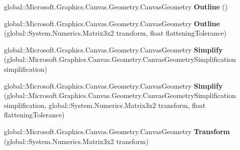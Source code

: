 \begin{DoxyCompactItemize}
\item 
\mbox{\label{interface_microsoft_1_1_graphics_1_1_canvas_1_1_geometry_1_1_i_canvas_geometry_a7b1a716eb0cbfbd552347d14e00268b7}} 
global\+::\+Microsoft.\+Graphics.\+Canvas.\+Geometry.\+Canvas\+Geometry {\bfseries Outline} ()
\item 
\mbox{\label{interface_microsoft_1_1_graphics_1_1_canvas_1_1_geometry_1_1_i_canvas_geometry_ab685f87179af5eed5881feb2e4aa5c22}} 
global\+::\+Microsoft.\+Graphics.\+Canvas.\+Geometry.\+Canvas\+Geometry {\bfseries Outline} (global\+::\+System.\+Numerics.\+Matrix3x2 transform, float flattening\+Tolerance)
\item 
\mbox{\label{interface_microsoft_1_1_graphics_1_1_canvas_1_1_geometry_1_1_i_canvas_geometry_a1420c252e6995b540a402dc6d2088ff0}} 
global\+::\+Microsoft.\+Graphics.\+Canvas.\+Geometry.\+Canvas\+Geometry {\bfseries Simplify} (global\+::\+Microsoft.\+Graphics.\+Canvas.\+Geometry.\+Canvas\+Geometry\+Simplification simplification)
\item 
\mbox{\label{interface_microsoft_1_1_graphics_1_1_canvas_1_1_geometry_1_1_i_canvas_geometry_a4b3fad1c94d6807ac4628caa31ddcdfa}} 
global\+::\+Microsoft.\+Graphics.\+Canvas.\+Geometry.\+Canvas\+Geometry {\bfseries Simplify} (global\+::\+Microsoft.\+Graphics.\+Canvas.\+Geometry.\+Canvas\+Geometry\+Simplification simplification, global\+::\+System.\+Numerics.\+Matrix3x2 transform, float flattening\+Tolerance)
\item 
\mbox{\label{interface_microsoft_1_1_graphics_1_1_canvas_1_1_geometry_1_1_i_canvas_geometry_ac5c73fa815ab9daab0120a273c2a9f7a}} 
global\+::\+Microsoft.\+Graphics.\+Canvas.\+Geometry.\+Canvas\+Geometry {\bfseries Transform} (global\+::\+System.\+Numerics.\+Matrix3x2 transform)
\item 
\mbox{\label{interface_microsoft_1_1_graphics_1_1_canvas_1_1_geometry_1_1_i_canvas_geometry_a2ccaa7f710d287e5e4dd8170deb5f559}} 

\end{DoxyCompactItemize}
